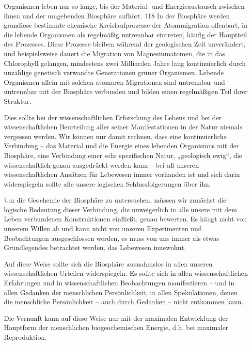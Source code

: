 \documentclass[11pt,a4paper]{book}
\begin{document}
Organismen leben nur so lange, bis der Material- und Energieaustausch zwischen ihnen und der umgebenden Biosphäre aufhört. 118 In der Biosphäre werden grandiose bestimmte chemische Kreislaufprozesse der Atommigration offenbart, in die lebende Organismen als regelmäßig untrennbar eintreten, häufig der Hauptteil des Prozesses. Diese Prozesse bleiben während der geologischen Zeit unverändert, und beispielsweise dauert die Migration von Magnesiumatomen, die in das Chlorophyll gelangen, mindestens zwei Milliarden Jahre lang kontinuierlich durch unzählige genetisch verwandte Generationen grüner Organismen. Lebende Organismen allein mit solchen atomaren Migrationen sind untrennbar und untrennbar mit der Biosphäre verbunden und bilden einen regelmäßigen Teil ihrer Struktur.



Dies sollte bei der wissenschaftlichen Erforschung des Lebens und bei der wissenschaftlichen Beurteilung aller seiner Manifestationen in der Natur niemals vergessen werden. Wir können nur damit rechnen, dass eine kontinuierliche Verbindung -- das Material und die Energie eines lebenden Organismus mit der Biosphäre, eine Verbindung einer sehr spezifischen Natur, „geologisch ewig“, die wissenschaftlich genau ausgedrückt werden kann -- bei all unseren wissenschaftlichen Ansätzen für Lebewesen immer vorhanden ist und sich darin widerspiegeln sollte alle unsere logischen Schlussfolgerungen über ihn.



Um die Geochemie der Biosphäre zu untersuchen, müssen wir zunächst die logische Bedeutung dieser Verbindung, die unweigerlich in alle unsere mit dem Leben verbundenen Konstruktionen einfließt, genau bewerten. Es hängt nicht von unserem Willen ab und kann nicht von unseren Experimenten und Beobachtungen ausgeschlossen werden, es muss von uns immer als etwas Grundlegendes betrachtet werden, das Lebewesen innewohnt.



Auf diese Weise sollte sich die Biosphäre ausnahmslos in allen unseren wissenschaftlichen Urteilen widerspiegeln. Es sollte sich in allen wissenschaftlichen Erfahrungen und in wissenschaftlichen Beobachtungen manifestieren -- und in allen Gedanken der menschlichen Persönlichkeit, in allen Spekulationen, denen die menschliche Persönlichkeit -- auch durch Gedanken -- nicht entkommen kann.



Die Vernunft kann auf diese Weise nur mit der maximalen Entwicklung der Hauptform der menschlichen biogeochemischen Energie, d.h. bei maximaler Reproduktion.
\end{document}
